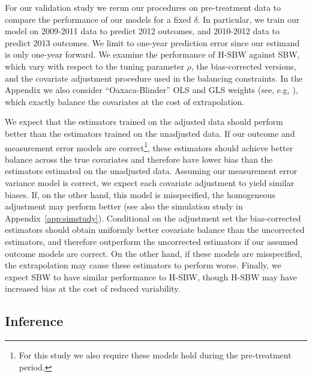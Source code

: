 \documentclass[aoas]{imsart}
\theoremstyle{plain}
\theoremstyle{remark}
\begin{document}
For our validation study we rerun our procedures on pre-treatment data to compare the performance of our models for a fixed $\delta$. In particular, we train our model on 2009-2011 data to predict 2012 outcomes, and 2010-2012 data to predict 2013 outcomes. We limit to one-year prediction error since our estimand is only one-year forward. We examine the performance of H-SBW against SBW, which vary with respect to the tuning parameter $\rho$, the bias-corrected versions, and the covariate adjustment procedure used in the balancing constraints. In the Appendix we also consider ``Oaxaca-Blinder'' OLS and GLS weights (see, e.g, \cite{kline2011oaxaca}), which exactly balance the covariates at the cost of extrapolation.

We expect that the estimators trained on the adjusted data should perform better than the estimators trained on the unadjusted data. If our outcome and measurement error models are correct\footnote{For this study we also require these models hold during the pre-treatment period.}, these estimators should achieve better balance across the true covariates and therefore have lower bias than the estimators estimated on the unadjusted data. Assuming our measurement error variance model is correct, we expect each covariate adjustment to yield similar biases. If, on the other hand, this model is misspecified, the homogeneous adjustment may perform better (see also the simulation study in Appendix~\ref{app:simstudy}). Conditional on the adjustment set the bias-corrected estimators should obtain uniformly better covariate balance than the uncorrected estimators, and therefore outperform the uncorrected estimators if our assumed outcome models are correct. On the other hand, if these models are misspecified, the extrapolation may cause these estimators to perform worse. Finally, we expect SBW to have similar performance to H-SBW, though H-SBW may have increased bias at the cost of reduced variability. 

\subsection{Inference}
\end{document}
